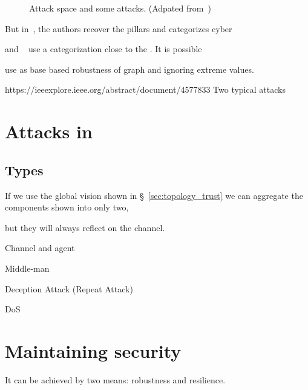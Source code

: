 \documentclass[../main.tex]{subfiles}
\begin{document}
\begin{figure}[h]
  \caption[Attack space and some attacks.]{Attack space and some attacks. (Adpated from~\cite{TeixeiraEtAl2015})}\label{fig:3_dimensions_attack_with_attacks}
\end{figure}



But in~\cite{TeixeiraEtAl2015}, the authors recover the \CIA{} pillars and categorizes cyber

\cite{DibajiEtAl2019} and ~ use a categorization close to the \CIA{}. It is possible

use as base
\cite{MaestreEtAl2018}
\cite{DibajiIshii2015,WangIshii2019,VelardeEtAl2018} based robustness of graph and ignoring extreme values.

https://ieeexplore.ieee.org/abstract/document/4577833
\cite{CaiEtAl2019,ZhangEtAl2021b}
Two typical attacks \cite{ZhangEtAl2021a}

\section{Attacks in \dmpc{}}\label{sec:attacks_in_dmpc}

\subsection{Types}\label{sec:types_of_attacks}
If we use the global vision shown in \S~\ref{sec:topology_trust} we can aggregate the components shown into only two,
\cite{PasqualettiEtAl2013}
\cite{BoemEtAl2020}

but they will always reflect on the channel.


Channel and agent

Middle-man

Deception Attack (Repeat Attack)

DoS

\cite{GuEtAl2016}

\section{Maintaining security}\label{sec:maintaining_security}
It can be achieved by two means: robustness and resilience.
\end{document}
